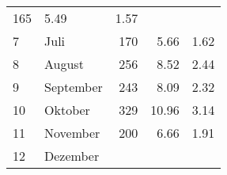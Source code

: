 \begin{longtable}{lXrrr}
       \num{165} &
       \num[round-mode=places,round-precision=2]{5,49} &
         \num[round-mode=places,round-precision=2]{1,57} \\

     7 &
     \multicolumn{1}{X}{ Juli   } &


       \num{170} &
       \num[round-mode=places,round-precision=2]{5,66} &
         \num[round-mode=places,round-precision=2]{1,62} \\

     8 &
     \multicolumn{1}{X}{ August   } &


       \num{256} &
       \num[round-mode=places,round-precision=2]{8,52} &
         \num[round-mode=places,round-precision=2]{2,44} \\

     9 &
     \multicolumn{1}{X}{ September   } &


       \num{243} &
       \num[round-mode=places,round-precision=2]{8,09} &
         \num[round-mode=places,round-precision=2]{2,32} \\

     10 &
     \multicolumn{1}{X}{ Oktober   } &


       \num{329} &
       \num[round-mode=places,round-precision=2]{10,96} &
         \num[round-mode=places,round-precision=2]{3,14} \\

     11 &
     \multicolumn{1}{X}{ November   } &


       \num{200} &
       \num[round-mode=places,round-precision=2]{6,66} &
         \num[round-mode=places,round-precision=2]{1,91} \\

     12 &
     \multicolumn{1}{X}{ Dezember   } &



\end{longtable}
